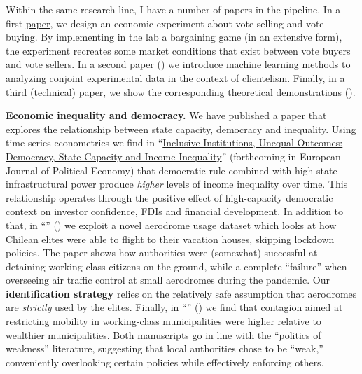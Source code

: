 Within the same research line, I have a number of papers in the pipeline. In a first \href{https://github.com/hbahamonde/Economic_Experiment_Vote_Selling/raw/master/abstract.txt}{paper}, we design an economic experiment about vote selling and vote buying. By implementing in the lab a bargaining game (in an extensive form), the experiment recreates some market conditions that exist between vote buyers and vote sellers. In a second \href{https://github.com/hbahamonde/Conjoint_US/raw/master/Bahamonde_Quininao_Conjoint.pdf}{paper} ({\unskip}) we introduce machine learning methods to analyzing conjoint experimental data in the context of clientelism. Finally, in a third (technical) \href{https://github.com/hbahamonde/Conjoint_US/raw/master/Bahamonde_Quininao_Conjoint_Letter_PA.pdf}{paper}, we show the corresponding theoretical demonstrations ({\unskip}).


{\bf Economic inequality and democracy.} We have published a paper that explores the relationship between state capacity, democracy and inequality. Using time-series econometrics we find in ``\href{https://github.com/hbahamonde/Inequality_State_Capacity/raw/main/Bahamonde_Trasberg.pdf}{Inclusive Institutions, Unequal Outcomes: Democracy, State Capacity and Income Inequality}'' (forthcoming in European Journal of Political Economy) that democratic rule combined with high state infrastructural power produce \emph{higher} levels of income inequality over time. This relationship operates through the positive effect of high-capacity democratic context on investor confidence, FDIs and financial development. In addition to that, in ``\href{https://raw.githubusercontent.com/hbahamonde/Tobalaba/master/abstract.txt}{{\unskip}}'' (\emph{\unskip}) we exploit a novel aerodrome usage dataset which looks at how Chilean elites were able to flight to their vacation houses, skipping lockdown policies. The paper shows how authorities were (somewhat) successful at detaining working class citizens on the ground, while a complete ``failure'' when overseeing air traffic control at small aerodromes during the pandemic. Our {\bf identification strategy} relies on the relatively safe assumption that aerodromes are \emph{strictly} used by the elites. Finally, in ``\href{https://github.com/hbahamonde/Bus/raw/main/abstract.txt}{{\unskip}}'' (\emph{\unskip}) we find that contagion aimed at restricting mobility in working-class municipalities were higher relative to wealthier municipalities. Both manuscripts go in line with the ``politics of weakness'' literature, suggesting that local authorities chose to be ``weak,'' conveniently overlooking certain policies while effectively enforcing others.

